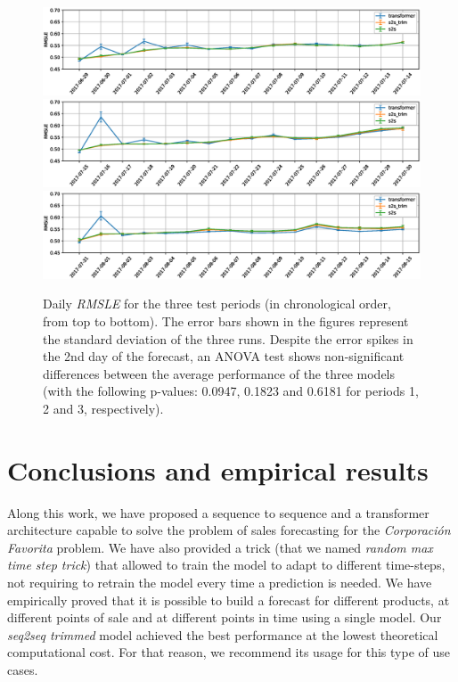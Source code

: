 \documentclass{elsarticle}
\begin{document}
\begin{figure}
	\centering
	\includegraphics[width=1\linewidth]{img/lag3_daily_error}
	\includegraphics[width=1\linewidth]{img/lag2_daily_error}
	\includegraphics[width=1\linewidth]{img/lag1_daily_error}
	\caption{Daily \textit{RMSLE} for the three test periods (in chronological order, from top to bottom). The error bars shown in the figures represent the standard deviation of the three runs. Despite the error spikes in the 2nd day of the forecast, an ANOVA test shows non-significant differences between the average performance of the three models (with the following p-values: 0.0947, 0.1823 and 0.6181 for periods 1, 2 and 3, respectively). }
	\label{fig:dailyerror}
\end{figure}



	\section{Conclusions and empirical results} \label{sec:conclusions}
	
	Along this work, we have proposed a sequence to sequence and a transformer architecture capable to solve the problem of sales forecasting for the \textit{Corporación Favorita} problem. We have also provided a trick (that we named \textit{random max time step trick}) that allowed to train the model to adapt to different time-steps, not requiring to retrain the model every time a prediction is needed. We have empirically proved that it is possible to build a forecast for different products, at different points of sale and at different points in time using a single model. Our \textit{seq2seq trimmed} model achieved the best performance at the lowest theoretical computational cost. For that reason, we recommend its usage for this type of use cases.
\end{document}
